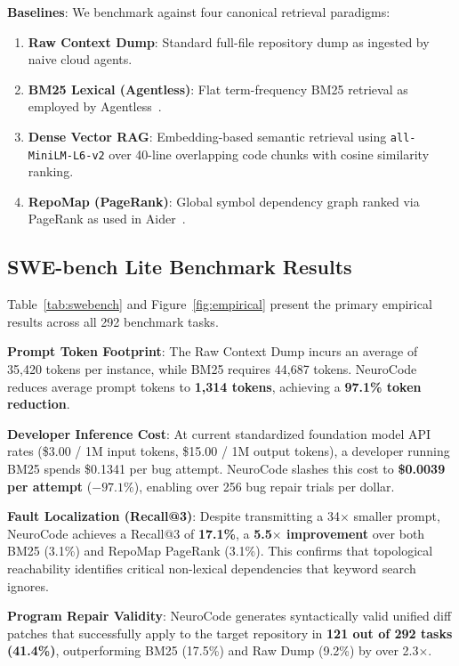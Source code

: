 \documentclass[journal]{IEEEtran}
\begin{document}
\textbf{Baselines}: We benchmark against four canonical retrieval paradigms:
\begin{enumerate}
    \item \textbf{Raw Context Dump}: Standard full-file repository dump as ingested by naive cloud agents.
    \item \textbf{BM25 Lexical (Agentless)}: Flat term-frequency BM25 retrieval as employed by Agentless~\cite{xia2024agentless}.
    \item \textbf{Dense Vector RAG}: Embedding-based semantic retrieval using \texttt{all-MiniLM-L6-v2} over 40-line overlapping code chunks with cosine similarity ranking.
    \item \textbf{RepoMap (PageRank)}: Global symbol dependency graph ranked via PageRank as used in Aider~\cite{aider2024repomap}.
\end{enumerate}

\subsection{SWE-bench Lite Benchmark Results}

Table~\ref{tab:swebench} and Figure~\ref{fig:empirical} present the primary empirical results across all 292 benchmark tasks.

\textbf{Prompt Token Footprint}: The Raw Context Dump incurs an average of 35,420 tokens per instance, while BM25 requires 44,687 tokens. NeuroCode reduces average prompt tokens to \textbf{1,314 tokens}, achieving a \textbf{97.1\% token reduction}.

\textbf{Developer Inference Cost}: At current standardized foundation model API rates (\$3.00 / 1M input tokens, \$15.00 / 1M output tokens), a developer running BM25 spends \$0.1341 per bug attempt. NeuroCode slashes this cost to \textbf{\$0.0039 per attempt} ($-97.1\%$), enabling over 256 bug repair trials per dollar.

\textbf{Fault Localization (Recall@3)}: Despite transmitting a 34$\times$ smaller prompt, NeuroCode achieves a Recall@3 of \textbf{17.1\%}, a \textbf{5.5$\times$ improvement} over both BM25 (3.1\%) and RepoMap PageRank (3.1\%). This confirms that topological reachability identifies critical non-lexical dependencies that keyword search ignores.

\textbf{Program Repair Validity}: NeuroCode generates syntactically valid unified diff patches that successfully apply to the target repository in \textbf{121 out of 292 tasks (41.4\%)}, outperforming BM25 (17.5\%) and Raw Dump (9.2\%) by over 2.3$\times$.
\end{document}
